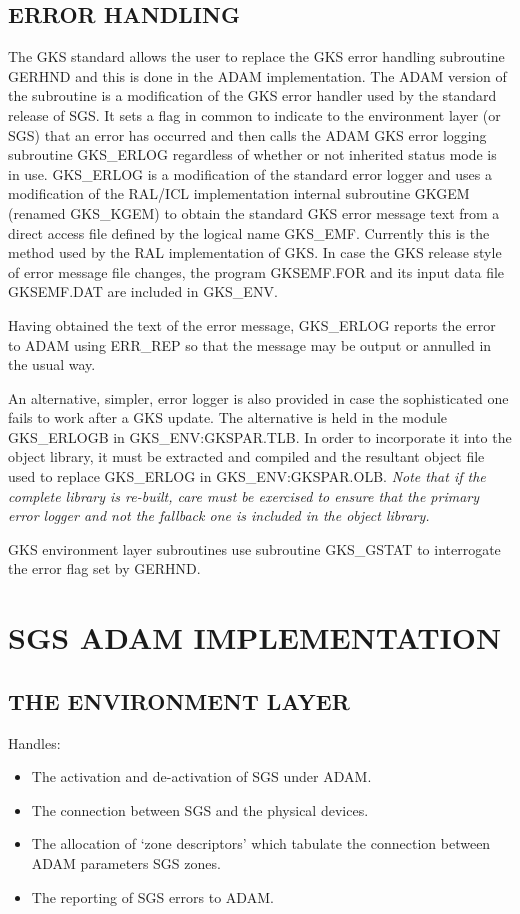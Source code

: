 \subsection{ERROR HANDLING}
The GKS standard allows the user to replace the GKS error handling subroutine
GERHND and this is done in the ADAM implementation. The ADAM version of the
subroutine is a modification of the GKS error handler used by
the standard release of SGS.
It sets a flag in common to indicate to the environment layer (or SGS) that
an error has occurred
and then calls the ADAM GKS error logging subroutine GKS\_ERLOG regardless
of whether or not inherited status mode is in use.
GKS\_ERLOG is a modification of the standard error logger and uses a
modification of the RAL/ICL implementation internal subroutine GKGEM
(renamed GKS\_KGEM) to obtain the standard GKS error message text from a
direct access file defined by the logical name GKS\_EMF.
Currently this is the method used by the RAL
implementation of GKS.
In case the GKS release style of error message file changes, the program
GKSEMF.FOR and its input data file GKSEMF.DAT are included in GKS\_ENV.

Having obtained the text of the error message, GKS\_ERLOG reports the error
to ADAM using ERR\_REP so that the message may be output or annulled in the
usual way.

An alternative, simpler, error logger is also provided in case the sophisticated
one fails to work after a GKS update.
The alternative is held in the module GKS\_ERLOGB in GKS\_ENV:GKSPAR.TLB.
In order to incorporate it into the object library, it must be extracted and
compiled and the resultant object file used to replace GKS\_ERLOG in
GKS\_ENV:GKSPAR.OLB.
{\em Note that if the complete library is re-built, care must be exercised to
ensure that the primary error logger and not the fallback one is included in
the object library.}

GKS environment layer subroutines use subroutine GKS\_GSTAT to interrogate
the error flag set by GERHND.

\section{SGS ADAM IMPLEMENTATION}

\subsection{THE ENVIRONMENT LAYER}
Handles:
\begin{itemize}
\item The activation and de-activation of SGS under ADAM.
\item The connection between SGS and the physical devices.
\item The allocation of `zone descriptors' which tabulate the connection
between ADAM parameters SGS zones.
\item The reporting of SGS errors to ADAM.
\end{itemize}

